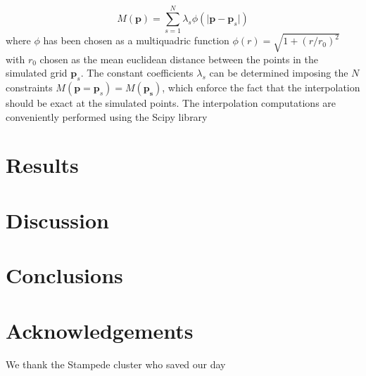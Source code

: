 \documentclass[reprint,aps,prd,superscriptaddress,showkeys]{revtex4-1}
\begin{document}
\begin{equation}
M(\mathbf{p}) = \sum_{s=1}^N \lambda_s\phi(\vert\mathbf{p}-\mathbf{p}_s\vert)
\end{equation}
%
where $\phi$ has been chosen as a multiquadric function $\phi(r)=\sqrt{1+(r/r_0)^2}$ with $r_0$ chosen as the mean euclidean distance between the points in the simulated grid $\mathbf{p}_s$. The constant coefficients $\lambda_s$ can be determined imposing the $N$ constraints $M(\mathbf{p}=\mathbf{p}_s)=M(\mathbf{p_s})$, which enforce the fact that the interpolation should be exact at the simulated points. The interpolation computations are conveniently performed using the Scipy library \citep{scipy} 


\section{Results}


\section{Discussion}


\section{Conclusions}

 

\section*{Acknowledgements}
We thank the Stampede cluster who saved our day


\label{lastpage}
\end{document}
